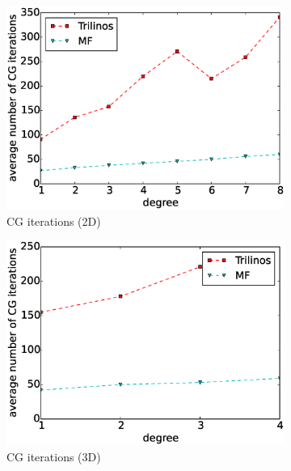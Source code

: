 \documentclass[preprint,12pt,times]{elsarticle}
\begin{document}
\begin{figure}[!ht]
  \begin{subfigure}[b]{0.49\textwidth}
    \centering
    \includegraphics[width=\textwidth]{Emmy_RRZE_cg2d.eps}
    \caption{CG iterations (2D)}
    \label{fig:benchmark_miehe_Emmy_cg2}
  \end{subfigure}
  \begin{subfigure}[b]{0.49\textwidth}
    \centering
    \includegraphics[width=\textwidth]{Emmy_RRZE_cg3d.eps}
    \caption{CG iterations (3D)}
    \label{fig:benchmark_miehe_Emmy_cg3}
  \end{subfigure}
  ~
  \begin{subfigure}[b]{0.49\textwidth}
    \centering

\end{subfigure}
\end{figure}
\end{document}
